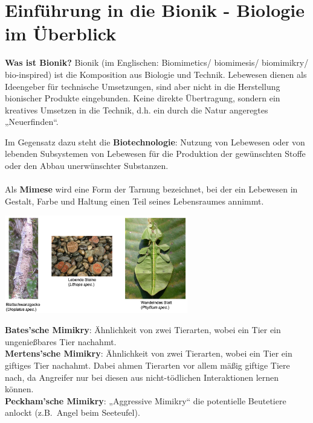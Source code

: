 \section{Einführung in die Bionik - Biologie im Überblick}

\textbf{Was ist Bionik?} Bionik (im Englischen: Biomimetics/ biomimesis/ biomimikry/ bio-inspired) ist die Komposition aus Biologie und Technik. Lebewesen dienen als Ideengeber für technische Umsetzungen, sind aber nicht in die Herstellung bionischer Produkte eingebunden. Keine direkte Übertragung, sondern ein kreatives Umsetzen in die Technik, d.h. ein durch die Natur angeregtes „Neuerfinden“.

Im Gegensatz dazu steht die \textbf{Biotechnologie}: Nutzung von Lebewesen oder von lebenden Subsystemen von Lebewesen für die Produktion der gewünschten Stoffe oder den Abbau unerwünschter Substanzen.
\\
\\
Als \textbf{Mimese} wird eine Form der Tarnung bezeichnet, bei der ein Lebewesen in Gestalt, Farbe und Haltung einen Teil seines Lebensraumes annimmt.

\begin{center}
	\includegraphics[width=8cm]{lec1/figures/Mimese.png}	
\end{center}
\textbf{Bates'sche Mimikry}: Ähnlichkeit von zwei Tierarten, wobei ein Tier ein ungenießbares Tier nachahmt.\\
\textbf{Mertens'sche Mimikry}: Ähnlichkeit von zwei Tierarten, wobei ein Tier ein giftiges Tier nachahmt. Dabei ahmen Tierarten vor allem mäßig giftige Tiere nach, da Angreifer nur bei diesen aus nicht-tödlichen Interaktionen lernen können.\\
\textbf{Peckham'sche Mimikry}: „Aggressive Mimikry“ die potentielle Beutetiere anlockt (z.B.\ Angel beim Seeteufel).


